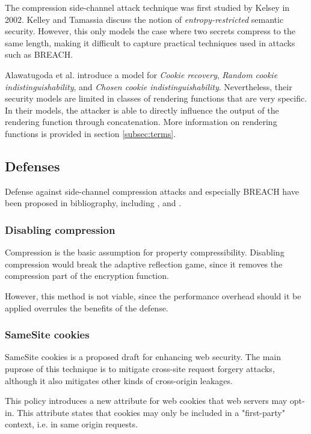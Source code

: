 \documentclass[conference, letterpaper, 10pt]{IEEEtran}
\begin{document}
The compression side-channel attack technique was first studied by Kelsey \cite{c4} in 2002.
Kelley and Tamassia\cite{c5} discuss the notion of \textit{entropy-restricted} semantic
security. However, this only models the case where two secrets compress to the same
length, making it difficult to capture practical techniques used in attacks
such as BREACH.

Alawatugoda et al. \cite{c6} introduce a model for \textit{Cookie recovery},
\textit{Random cookie indistinguishability}, and \textit{Chosen cookie indistinguishability}.
Nevertheless, their security models are limited in classes of rendering functions
that are very specific. In their models, the attacker is able to directly influence
the output of the rendering function through concatenation. More information on
rendering functions is provided in section \ref{subsec:terms}.

\subsection{Defenses}

Defense against side-channel compression attacks and especially BREACH have been
proposed in bibliography, including \cite{c3}, \cite{c5} and \cite{c6}.

\subsubsection{Disabling compression}\label{subsec:disablecom}
Compression is the basic assumption for property compressibility. Disabling
compression would break the adaptive reflection game, since it removes
the compression part of the encryption function.

However, this method is not viable, since the performance overhead should it be
applied overrules the benefits of the defense.

\subsubsection{SameSite cookies}\label{subsec:samesite}
SameSite cookies \cite{c10} is a proposed draft for enhancing web security. The
main puprose of this technique is to mitigate cross-site request forgery
attacks, although it also mitigates other kinds of cross-origin leakages.

This policy introduces a new attribute for web cookies that web servers may
opt-in. This attribute states that cookies may only be included in a
"first-party" context, i.e. in same origin requests.
\end{document}
